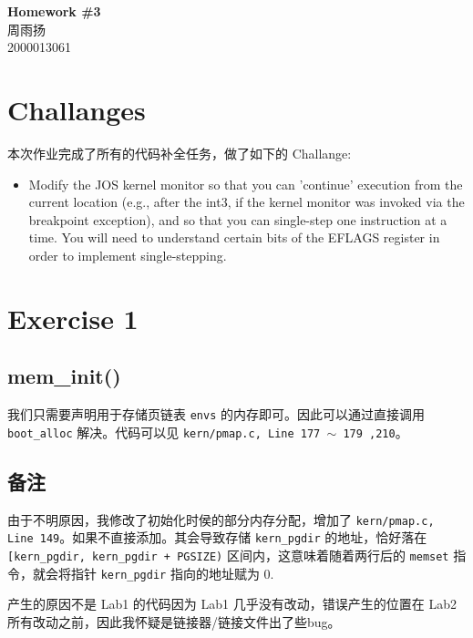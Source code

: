 \documentclass[11pt]{article}
\newcommand{\hwid}{3}			%
\newcommand{\name}{周雨扬} 		%
\newcommand{\id}{2000013061} 	%
\begin{document}
    \pagestyle{fancy}
    \chead{}

    \begin{center}
        {\LARGE \bf Homework \#\hwid}\\
        {\Large \name}\\
        {\Large \id}\\
    \end{center}

	\section{Challanges}
		\par 本次作业完成了所有的代码补全任务，做了如下的 Challange:
		\begin{itemize}
			\item Modify the JOS kernel monitor so that you can 'continue' execution from the current location (e.g., after the int3, if the kernel monitor was invoked via the breakpoint exception), and so that you can single-step one instruction at a time. You will need to understand certain bits of the EFLAGS register in order to implement single-stepping.
		\end{itemize}
		
	\section{Exercise 1}
	
		
	\subsection*{mem\_init()}
		\par 我们只需要声明用于存储页链表 \texttt{envs} 的内存即可。因此可以通过直接调用 \texttt{boot\_alloc} 解决。代码可以见 \texttt{kern/pmap.c, Line 177 $\sim$ 179 ,210}。
		
	\subsection*{备注}
		由于不明原因，我修改了初始化时侯的部分内存分配，增加了 \texttt{kern/pmap.c, Line 149}。如果不直接添加。其会导致存储 \texttt{kern\_pgdir} 的地址，恰好落在 \texttt{[kern\_pgdir, kern\_pgdir + PGSIZE)} 区间内，这意味着随着两行后的 \texttt{memset} 指令，就会将指针 \texttt{kern\_pgdir} 指向的地址赋为 0.
		
		产生的原因不是 Lab1 的代码因为 Lab1 几乎没有改动，错误产生的位置在 Lab2 所有改动之前，因此我怀疑是链接器/链接文件出了些bug。
		
\end{document}
